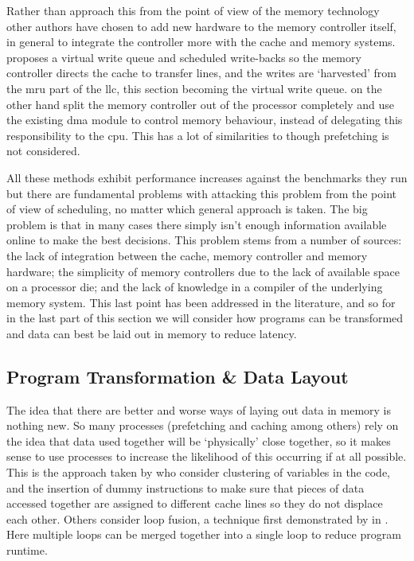Rather than approach this from the point of view of the memory technology other authors have chosen to add new hardware to the memory controller itself, in general to integrate the controller more with the cache and memory systems. \citet{stuecheliCoordinatingDRAMLastLevelCache2011} proposes a virtual write queue and scheduled write-backs so the memory controller directs the cache to transfer lines, and the writes are `harvested' from the \gls{mru} part of the \gls{llc}, this section becoming the virtual write queue. \citet{waslyHidingMemoryLatency2014} on the other hand split the memory controller out of the processor completely and use the existing \gls{dma} module to control memory behaviour, instead of delegating this responsibility to the \gls{cpu}. This has a lot of similarities to \citet{veidenbaumDecoupledAccessDRAM1997} though prefetching is not considered.

All these methods exhibit performance increases against the benchmarks they run but there are fundamental problems with attacking this problem from the point of view of scheduling, no matter which general approach is taken. The big problem is that in many cases there simply isn't enough information available online to make the best decisions. This problem stems from a number of sources: the lack of integration between the cache, memory controller and memory hardware; the simplicity of memory controllers due to the lack of available space on a processor die; and the lack of knowledge in a compiler of the underlying memory system. This last point has been addressed in the literature, and so for in the last part of this section we will consider how programs can be transformed and data can best be laid out in memory to reduce latency. 

\subsection{Program Transformation \& Data Layout}

The idea that there are better and worse ways of laying out data in memory is nothing new. So many processes (prefetching and caching among others) rely on the idea that data used together will be `physically' close together, so it makes sense to use processes to increase the likelihood of this occurring if at all possible. This is the approach taken by \citet{pandaMemoryDataOrganization1997} who consider clustering of variables in the code, and the insertion of dummy instructions to make sure that pieces of data accessed together are assigned to different cache lines so they do not displace each other. Others consider loop fusion, a technique first demonstrated by \citet{gaoCollectiveLoopFusion1993} in \citeyear{gaoCollectiveLoopFusion1993}. Here multiple loops can be merged together into a single loop to reduce program runtime. 

